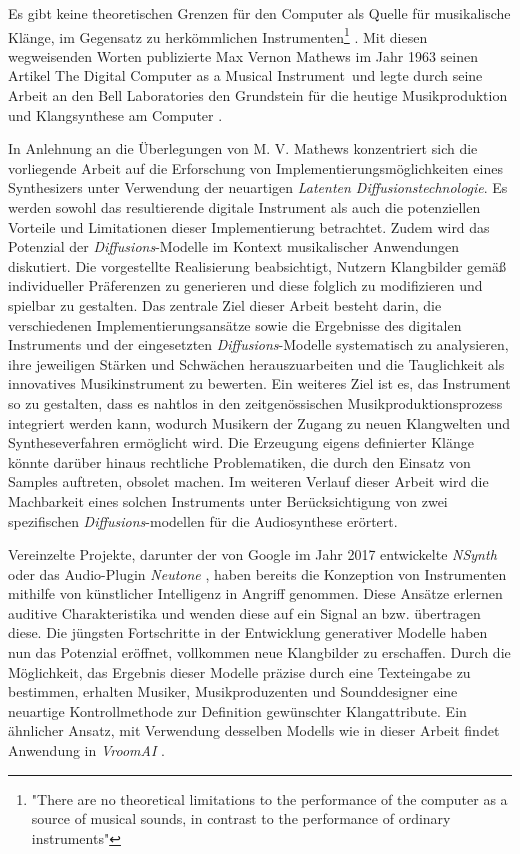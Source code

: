 \documentclass[
  a4paper,  %
  twoside,  %
  bibliography=totoc,
  headsepline,
  cleardoublepage=empty,
  parskip=half,
  draft=false
]{scrbook}
\begin{document}
\glqq Es gibt keine theoretischen Grenzen für den Computer als Quelle für musikalische Klänge, im Gegensatz zu herkömmlichen Instrumenten\grqq \footnote{"There are no theoretical limitations to the performance of the computer as a source of musical sounds, in contrast to the performance of ordinary instruments"} \cite{mathews_digital_1963}. Mit diesen wegweisenden Worten publizierte Max Vernon Mathews im Jahr 1963 seinen Artikel \glqq The Digital Computer as a Musical Instrument\grqq \, und legte durch seine Arbeit an den Bell Laboratories den Grundstein für die heutige Musikproduktion und Klangsynthese am Computer \cite{mathews_music_2004}.

In Anlehnung an die Überlegungen von M. V. Mathews konzentriert sich die vorliegende Arbeit auf die Erforschung von Implementierungsmöglichkeiten eines Synthesizers unter Verwendung der neuartigen \emph{Latenten Diffusionstechnologie}. Es werden sowohl das resultierende digitale Instrument als auch die potenziellen Vorteile und Limitationen dieser Implementierung betrachtet. Zudem wird das Potenzial der \emph{Diffusions}-Modelle im Kontext musikalischer Anwendungen diskutiert. Die vorgestellte Realisierung beabsichtigt, Nutzern Klangbilder gemäß individueller Präferenzen zu generieren und diese folglich zu modifizieren und spielbar zu gestalten. Das zentrale Ziel dieser Arbeit besteht darin, die verschiedenen Implementierungsansätze sowie die Ergebnisse des digitalen Instruments und der eingesetzten \emph{Diffusions}-Modelle systematisch zu analysieren, ihre jeweiligen Stärken und Schwächen herauszuarbeiten und die Tauglichkeit als innovatives Musikinstrument zu bewerten. Ein weiteres Ziel ist es, das Instrument so zu gestalten, dass es nahtlos in den zeitgenössischen Musikproduktionsprozess integriert werden kann, wodurch Musikern der Zugang zu neuen Klangwelten und Syntheseverfahren ermöglicht wird. Die Erzeugung eigens definierter Klänge könnte darüber hinaus rechtliche Problematiken, die durch den Einsatz von Samples auftreten, obsolet machen. Im weiteren Verlauf dieser Arbeit wird die Machbarkeit eines solchen Instruments unter Berücksichtigung von zwei spezifischen \emph{Diffusions}-modellen für die Audiosynthese erörtert.

Vereinzelte Projekte, darunter der von Google im Jahr 2017 entwickelte \emph{NSynth} \cite{google_ai_nsynth_2017} oder das Audio-Plugin \emph{Neutone} \cite{qosmo_neutone_nodate}, haben bereits die Konzeption von Instrumenten mithilfe von künstlicher Intelligenz in Angriff genommen. Diese Ansätze erlernen auditive Charakteristika und wenden diese auf ein Signal an bzw. übertragen diese. Die jüngsten Fortschritte in der Entwicklung generativer Modelle haben nun das Potenzial eröffnet, vollkommen neue Klangbilder zu erschaffen. Durch die Möglichkeit, das Ergebnis dieser Modelle präzise durch eine Texteingabe zu bestimmen, erhalten Musiker, Musikproduzenten und Sounddesigner eine neuartige Kontrollmethode zur Definition gewünschter Klangattribute. Ein ähnlicher Ansatz, mit Verwendung desselben Modells wie in dieser Arbeit findet Anwendung in \emph{VroomAI} \cite{barney_hill_vroomai_2023}.
\end{document}
